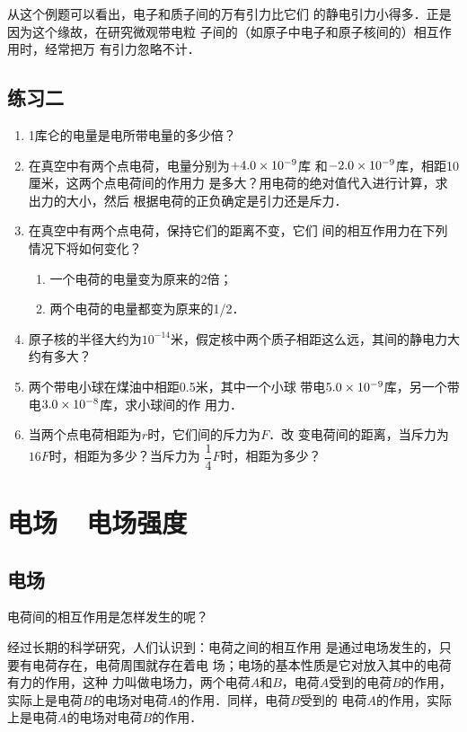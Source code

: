 从这个例题可以看出，电子和质子间的万有引力比它们
的静电引力小得多．正是因为这个缘故，在研究微观带电粒
子间的（如原子中电子和原子核间的）相互作用时，经常把万
有引力忽略不计．



\subsection*{练习二}

\begin{enumerate}
	\item 1库仑的电量是电所带电量的多少倍？
	\item 在真空中有两个点电荷，电量分别为$+4.0\times10^{-9}$库
和$-2.0\times10^{-9}$库，相距10厘米，这两个点电荷间的作用力
是多大？用电荷的绝对值代入进行计算，求出力的大小，然后
根据电荷的正负确定是引力还是斥力．
\item 在真空中有两个点电荷，保持它们的距离不变，它们
间的相互作用力在下列情况下将如何变化？
\begin{enumerate}
	\item 一个电荷的电量变为原来的2倍；
	\item 两个电荷的电量都变为原来的1/2．
\end{enumerate}
\item 原子核的半径大约为$10^{-14}$米，假定核中两个质子相距这么远，其间的静电力大约有多大？
\item 两个带电小球在煤油中相距0.5米，其中一个小球
带电$5.0\times10^{-9}$库，另一个带电$3.0\times10^{-8}$库，求小球间的作
用力．
\item 当两个点电荷相距为$r$时，它们间的斥力为$F$．改
变电荷间的距离，当斥力为$16F$时，相距为多少？当斥力为
$\dfrac{1}{4}F$时，相距为多少？
\end{enumerate}


\section{电场~~电场强度}

\subsection{电场}
电荷间的相互作用是怎样发生的呢？

经过长期的科学研究，人们认识到：电荷之间的相互作用
是通过电场发生的，只要有电荷存在，电荷周围就存在着电
场；电场的基本性质是它对放入其中的电荷有力的作用，这种
力叫做电场力，两个电荷$A$和$B$，电荷$A$受到的电荷$B$的作用，
实际上是电荷$B$的电场对电荷$A$的作用．同样，电荷$B$受到的
电荷$A$的作用，实际上是电荷$A$的电场对电荷$B$的作用．

